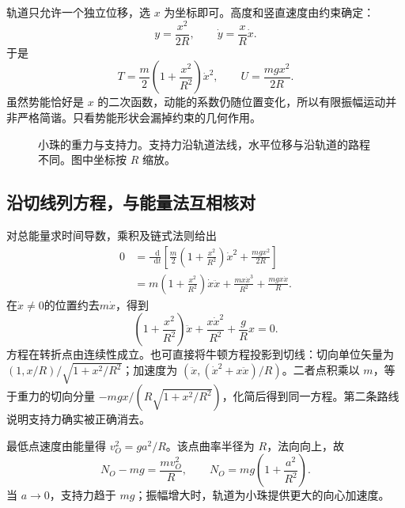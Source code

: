 \documentclass[11pt,openany,fontset=fandol]{ctexbook}
\theoremstyle{plain}\newtheorem{theorem}{定理}[chapter]\newtheorem{proposition}[theorem]{命题}
\theoremstyle{definition}\newtheorem{definition}{定义}[chapter]\newtheorem{example}{例}[chapter]
\theoremstyle{remark}\newtheorem*{remark}{说明}
\newcommand{\dd}{\mathop{}\!\mathrm d}\newcommand{\ii}{\mathrm i}\newcommand{\ee}{\mathrm e}
\begin{document}
轨道只允许一个独立位移，选 $x$ 为坐标即可。高度和竖直速度由约束确定：
\[
y=\frac{x^2}{2R},\qquad \dot y=\frac xR\dot x.
\]
于是
\begin{equation}\label{eq:bead-energy}
T=\frac m2\left(1+\frac{x^2}{R^2}\right)\dot x^2,\qquad
U=\frac{mgx^2}{2R}.
\end{equation}
虽然势能恰好是 $x$ 的二次函数，动能的系数仍随位置变化，所以有限振幅运动并非严格简谐。只看势能形状会漏掉约束的几何作用。

\begin{figure}[htbp]\centering
{}
\caption{小珠的重力与支持力。支持力沿轨道法线，水平位移与沿轨道的路程不同。图中坐标按 $R$ 缩放。}
\label{fig:orig-030}
\end{figure}

\subsection{沿切线列方程，与能量法互相核对}
对总能量求时间导数，乘积及链式法则给出
\[\begin{aligned}
0&=\frac{\dd}{\dd t}\left[\frac m2\left(1+\frac{x^2}{R^2}\right)\dot x^2
+\frac{mgx^2}{2R}\right]\\
&=m\left(1+\frac{x^2}{R^2}\right)\dot x\ddot x
+\frac{mx\dot x^3}{R^2}+\frac{mgx\dot x}{R}.
\end{aligned}\]
在$\dot x\ne0$的位置约去$m\dot x$，得到
\begin{equation}\label{eq:bead-ode}
\left(1+\frac{x^2}{R^2}\right)\ddot x+
\frac{x\dot x^2}{R^2}+\frac gR x=0.
\end{equation}
方程在转折点由连续性成立。也可直接将牛顿方程投影到切线：切向单位矢量为 $(1,x/R)/\sqrt{1+x^2/R^2}$；加速度为 $(\ddot x,(\dot x^2+x\ddot x)/R)$。二者点积乘以 $m$，等于重力的切向分量 $-mgx/(R\sqrt{1+x^2/R^2})$，化简后得到同一方程。第二条路线说明支持力确实被正确消去。

最低点速度由能量得 $v_O^2=ga^2/R$。该点曲率半径为 $R$，法向向上，故
\[
N_O-mg=\frac{mv_O^2}{R},\qquad N_O=mg\left(1+\frac{a^2}{R^2}\right).
\]
当 $a\to0$，支持力趋于 $mg$；振幅增大时，轨道为小珠提供更大的向心加速度。
\end{document}
